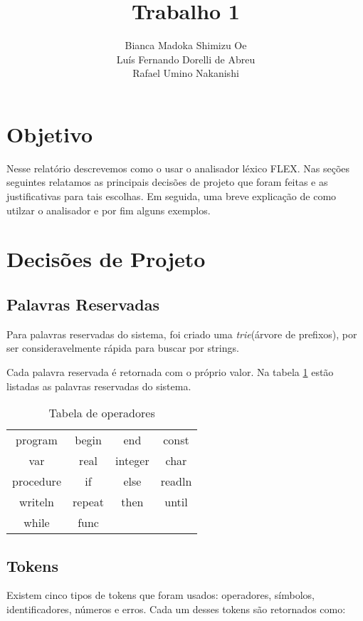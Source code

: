 \documentclass {article}
\title {Trabalho 1}
\author {Bianca Madoka Shimizu Oe \\ 
		Luís Fernando Dorelli de Abreu \\  
		Rafael Umino Nakanishi}
\begin{document}
\titlepage
\maketitle

\section{Objetivo}
	Nesse relatório descrevemos como o usar o analisador léxico FLEX. Nas seções seguintes relatamos as principais decisões de projeto que foram feitas e as justificativas para tais escolhas. Em seguida, uma breve explicação de como utilzar o analisador e por fim alguns exemplos.
	
\section{Decisões de Projeto}
	\subsection{Palavras Reservadas}
		Para palavras reservadas do sistema, foi criado uma \emph{trie}(árvore de prefixos), por ser consideravelmente rápida para buscar por strings.
		
		Cada palavra reservada é retornada com o próprio valor. Na tabela \ref{tb_pr} estão listadas as palavras reservadas do sistema.
		\begin{table}[ht]
		
		\centering
		\begin{tabular}{cccc}
			\toprule
			program & begin & end & const \\
			var & real & integer& char\\
			procedure & if & else & readln \\
			writeln & repeat & then & until\\
			while & func & & \\
			\bottomrule
		\end{tabular}
		\caption{Tabela de operadores}
		\label{tb_pr}
		
		\end{table}
		
	\subsection{Tokens}
		
		Existem cinco tipos de tokens que foram usados: operadores, símbolos, identificadores, números e erros. Cada um desses tokens são retornados como:
		
\end{document}
